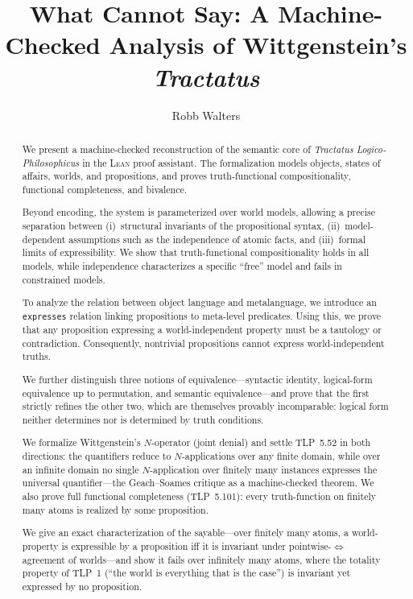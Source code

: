 \documentclass[jsl,bibother]{asl}
\title[What Lean Cannot Say]{What \Lean{} Cannot Say:
A Machine-Checked Analysis of Wittgenstein's \emph{Tractatus}}
\author{Robb Walters}
\theoremstyle{definition}
\theoremstyle{remark}
\newcommand{\Lean}{\textsc{Lean}}
\begin{document}
\begin{abstract}
We present a machine-checked reconstruction of the semantic core
of \emph{Tractatus Logico-Philosophicus} in the \Lean{} proof
assistant.  The formalization models objects, states of affairs,
worlds, and propositions, and proves truth-functional
compositionality, functional completeness, and bivalence.

Beyond encoding, the system is parameterized over world models,
allowing a precise separation between (i)~structural invariants
of the propositional syntax, (ii)~model-dependent assumptions
such as the independence of atomic facts, and (iii)~formal limits
of expressibility.  We show that truth-functional compositionality
holds in all models, while independence characterizes a specific
``free'' model and fails in constrained models.

To analyze the relation between object language and metalanguage,
we introduce an \texttt{expresses} relation linking propositions
to meta-level predicates.  Using this, we prove that any
proposition expressing a world-independent property must be a
tautology or contradiction.  Consequently, nontrivial propositions
cannot express world-independent truths.

We further distinguish three notions of
equivalence---syntactic identity, logical-form equivalence up to
permutation, and semantic equivalence---and prove that the first
strictly refines the other two, which are themselves provably
incomparable: logical form neither determines nor is determined
by truth conditions.

We formalize Wittgenstein's $N$-operator (joint denial) and
settle TLP~5.52 in both directions: the quantifiers reduce to
$N$-applications over any finite domain, while over an infinite
domain no single $N$-application over finitely many instances
expresses the universal quantifier---the Geach--Soames critique
as a machine-checked theorem.  We also prove full functional
completeness (TLP~5.101): every truth-function on finitely many
atoms is realized by some proposition.

We give an exact characterization of the sayable---over finitely
many atoms, a world-property is expressible by a proposition iff
it is invariant under pointwise-$\iff$ agreement of worlds---and
show it fails over infinitely many atoms, where the totality
property of TLP~1 (``the world is everything that is the case'')
is invariant yet expressed by no proposition.


\end{abstract}
\end{document}
